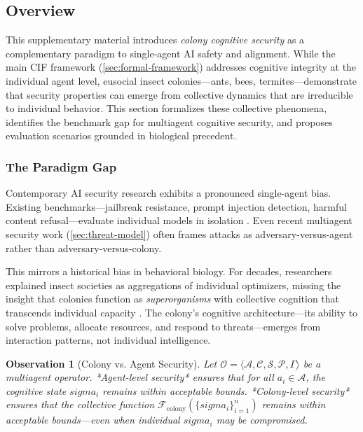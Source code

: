 \documentclass[
]{article}
\newtheorem{observation}[theorem]{Observation}
\begin{document}
\subsection{Overview}\label{sec:eusocial-overview}

This supplementary material introduces \emph{colony cognitive security}
as a complementary paradigm to single-agent AI safety and alignment.
While the main CIF framework (\cref{sec:formal-framework}) addresses
cognitive integrity at the individual agent level, eusocial insect
colonies---ants, bees, termites---demonstrate that security properties
can emerge from collective dynamics that are irreducible to individual
behavior. This section formalizes these collective phenomena, identifies
the benchmark gap for multiagent cognitive security, and proposes
evaluation scenarios grounded in biological precedent.

\subsubsection{The Paradigm Gap}\label{sec:paradigm-gap}

Contemporary AI security research exhibits a pronounced single-agent
bias. Existing benchmarks---jailbreak resistance, prompt injection
detection, harmful content refusal---evaluate individual models in
isolation \citep{perez2022red, wei2023jailbroken}. Even recent
multiagent security work (\cref{sec:threat-model}) often frames attacks
as adversary-versus-agent rather than adversary-versus-colony.

This mirrors a historical bias in behavioral biology. For decades,
researchers explained insect societies as aggregations of individual
optimizers, missing the insight that colonies function as
\emph{superorganisms} with collective cognition that transcends
individual capacity \citep{wilson1971insect}. The colony's cognitive
architecture---its ability to solve problems, allocate resources, and
respond to threats---emerges from interaction patterns, not individual
intelligence.

\begin{observation}[Colony vs. Agent Security]
\label{obs:colony-agent}
Let $\mathcal{O} = \langle \mathcal{A}, \mathcal{C}, \mathcal{S}, \mathcal{P}, \Gamma \rangle$ be a multiagent operator. *Agent-level security* ensures that for all $a_i \in \mathcal{A}$, the cognitive state $sigma_i$ remains within acceptable bounds. *Colony-level security* ensures that the collective function $\mathcal{F}_{\text{colony}}(\{sigma_i\}_{i=1}^n)$ remains within acceptable bounds—even when individual $sigma_i$ may be compromised.
\end{observation}
\end{document}
